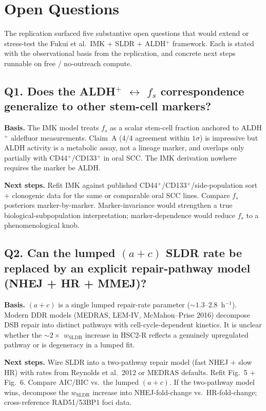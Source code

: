 \section{Open Questions}

The replication surfaced five substantive open questions that would extend or stress-test the
Fukui et al.\ IMK + SLDR + ALDH$^{+}$ framework. Each is stated with the observational basis from
the replication, and concrete next steps runnable on free / no-outreach compute.

\subsection*{Q1. Does the ALDH$^{+}$ $\leftrightarrow$ $f_s$ correspondence generalize to other stem-cell markers?}

\textbf{Basis.} The IMK model treats $f_s$ as a scalar stem-cell fraction anchored to ALDH$^{+}$
aldefluor measurements. Claim~A (4/4 agreement within $1\sigma$) is impressive but ALDH activity is
a metabolic assay, not a lineage marker, and overlaps only partially with CD44$^{+}$/CD133$^{+}$
in oral SCC. The IMK derivation nowhere requires the marker be ALDH.

\textbf{Next steps.} Refit IMK against published CD44$^{+}$/CD133$^{+}$/side-population sort +
clonogenic data for the same or comparable oral SCC lines. Compare $f_s$ posteriors
marker-by-marker. Marker-invariance would strengthen a true biological-subpopulation
interpretation; marker-dependence would reduce $f_s$ to a phenomenological knob.

\subsection*{Q2. Can the lumped $(a+c)$ SLDR rate be replaced by an explicit repair-pathway model
(NHEJ + HR + MMEJ)?}

\textbf{Basis.} $(a+c)$ is a single lumped repair-rate parameter ($\sim 1.3$--$2.8$~h$^{-1}$).
Modern DDR models (MEDRAS, LEM-IV, McMahon--Prise 2016) decompose DSB repair into distinct
pathways with cell-cycle-dependent kinetics. It is unclear whether the $\sim 2\times$
$w_{\mathrm{SLDR}}$ increase in HSC2-R reflects a genuinely upregulated pathway or is
degeneracy in a lumped fit.

\textbf{Next steps.} Wire SLDR into a two-pathway repair model (fast NHEJ + slow HR) with rates
from Reynolds et al.\ 2012 or MEDRAS defaults. Refit Fig.~5 + Fig.~6. Compare AIC/BIC vs.\ the
lumped $(a+c)$. If the two-pathway model wins, decompose the $w_{\mathrm{SLDR}}$ increase into
NHEJ-fold-change vs.\ HR-fold-change; cross-reference RAD51/53BP1 foci data.

